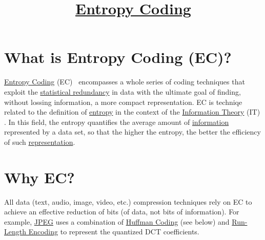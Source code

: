 



\title{\href{https://sistemas-multimedia.github.io/contents/entropy_coding/}{Entropy Coding}}

\maketitle

\tableofcontents

\section{What is Entropy Coding (EC)?}

\href{https://en.wikipedia.org/wiki/Entropy_coding}{Entropy Coding}
(EC)~\cite{vruiz__entropy_coding} encompasses a whole series of coding
techniques that exploit the
\href{https://en.wikipedia.org/wiki/Redundancy_(information_theory)}{statistical
  redundancy} in data with the ultimate goal of finding, without
lossing information, a more compact representation. EC is techniqe
related to the definition of
\href{https://en.wikipedia.org/wiki/Entropy_(information_theory)}{entropy}
in the context of the
\href{https://en.wikipedia.org/wiki/Information_theory}{Information
  Theory} (IT) \cite{vruiz__information_theory}. In this field, the
entropy quantifies the average amount of
\href{https://en.wikipedia.org/wiki/Information}{information}
represented by a data set, so that the higher the entropy, the better
the efficiency of such
\href{https://en.wikipedia.org/wiki/Data}{representation}.

\section{Why EC?}
All data (text, audio, image, video, etc.) compression techniques rely
on EC to achieve an effective reduction of bits (of data, not bits of
information). For example,
\href{https://en.wikipedia.org/wiki/JPEG}{JPEG} uses a combination of
\href{https://en.wikipedia.org/wiki/Huffman_coding}{Huffman Coding}
(see below) and
\href{https://en.wikipedia.org/wiki/Run-length_encoding}{Run-Length
  Encoding} to represent the quantized DCT coefficients.


